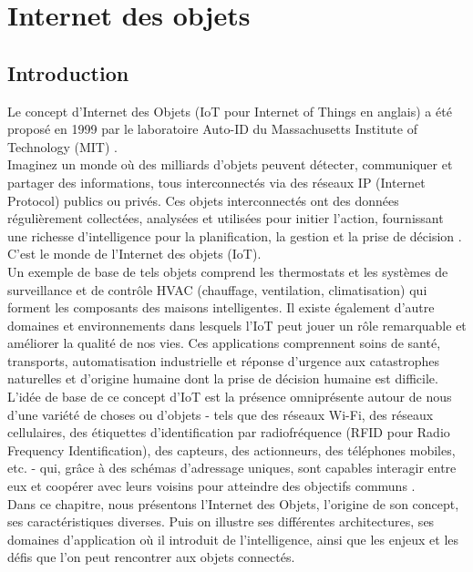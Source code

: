 \chapter{Internet des objets}
	
	
	\section{Introduction}
	Le concept  d’Internet des Objets (IoT pour Internet of Things en anglais) a été proposé en 1999 par le laboratoire Auto-ID du Massachusetts Institute of Technology (MIT) \cite{hu2016security}.\\ 

	Imaginez un monde où des milliards d'objets peuvent détecter, communiquer et partager des informations, tous interconnectés via des réseaux IP (Internet Protocol) publics ou privés. Ces objets interconnectés ont des données régulièrement collectées, analysées et utilisées pour initier l'action, fournissant une richesse d'intelligence pour la planif{\kern0pt}ication, la gestion et la prise de décision \cite{patel2016iot}. C'est le monde de l'Internet des objets (IoT).\\
	
	Un exemple de base de tels objets comprend les thermostats et les systèmes de surveillance et de contrôle HVAC (chauf{\kern0pt}fage, ventilation, climatisation) qui forment les composants des maisons intelligentes. Il existe également d’autre domaines et environnements dans lesquels l’IoT peut jouer un rôle remarquable et améliorer la qualité de nos vies. Ces applications comprennent soins de santé, transports, automatisation industrielle et réponse d'urgence aux catastrophes naturelles et d'origine humaine dont la prise de décision humaine est dif{\kern0pt}f{\kern0pt}icile.\\
	
	L'idée de base de ce concept d’IoT est la présence omniprésente autour de nous d'une variété de choses ou d'objets - tels que des réseaux Wi-Fi, des réseaux cellulaires, des étiquettes d'identif{\kern0pt}ication par radiofréquence (RFID pour Radio Frequency Identif{\kern0pt}ication), des capteurs, des actionneurs, des téléphones mobiles, etc. - qui, grâce à des schémas d'adressage uniques, sont capables interagir entre eux et coopérer avec leurs voisins pour atteindre des objectifs communs \cite{atzori2010iot}.\\
	
	Dans ce chapitre, nous présentons l’Internet des Objets, l’origine de son concept, ses caractéristiques diverses. Puis on illustre ses dif{\kern0pt}férentes architectures, ses domaines d’application où il introduit de l’intelligence, ainsi que les enjeux et les déf{\kern0pt}is que l’on peut rencontrer aux objets connectés.
	
